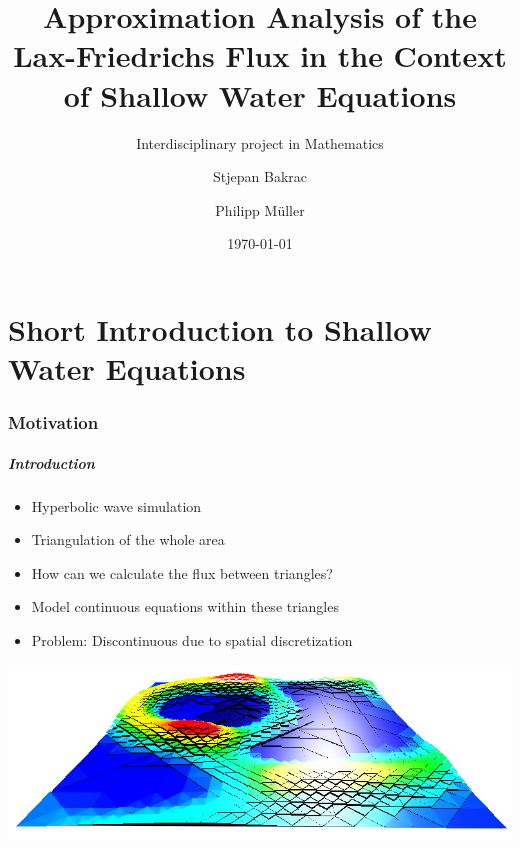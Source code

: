 \documentclass{beamer}
\title[]{Approximation Analysis of the Lax-Friedrichs Flux in the Context of Shallow Water Equations}
\subtitle{Interdisciplinary project in Mathematics}
\author[S. Bakrac, P. Müller]{Stjepan Bakrac \and Philipp Müller}
\date{\today}
\institute[TU München]{Technische Universität München}
\begin{document}
\part{Short Introduction to Shallow Water Equations}
\label{part:introduction}

\section{Motivation}

\frame{\titlepage}

\begin{frame}
  \frametitle{Introduction}
  \begin{itemize}
  \item Hyperbolic wave simulation
  \item 
    Triangulation of the whole area
  \item How can we calculate the flux between triangles?
  \item Model continuous equations within these triangles
  \item Problem: Discontinuous due to spatial discretization
  \end{itemize}
  \begin{center}
    \includegraphics[scale=1.5]{sample-screenshot2.png}
  \end{center}
\end{frame}

\end{document}
